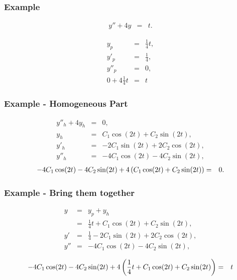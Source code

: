 \begin{frame}
  \frametitle{Example}

  \begin{eqnarray*}
    y'' + 4y & = & t.
  \end{eqnarray*}

  \begin{eqnarray*}
    y_p & = & \frac{1}{4} t, \\
    y'_p & = & \frac{1}{4}, \\
    y''_p & = & 0, \\
    0 + 4\frac{1}{4} t & = & t
  \end{eqnarray*}
\end{frame}

\begin{frame}
  \frametitle{Example - Homogeneous Part}

  \begin{eqnarray*}
    y''_h + 4y_h & = & 0, \\
    y_h & = & C_1 \cos(2t) + C_2 \sin(2t), \\
    y'_h & = & -2 C_1 \sin(2t) + 2 C_2 \cos(2t), \\
    y''_h & = & -4 C_1 \cos(2t) - 4 C_2 \sin(2t), 
  \end{eqnarray*}
  \begin{eqnarray*}
    -4 C_1 \cos(2t) - 4 C_2 \sin(2t) + 4\left( C_1 \cos(2t) + C_2 \sin(2t) \right) & = & 0.
  \end{eqnarray*}

\end{frame}


\begin{frame}
  \frametitle{Example - Bring them together}

  \begin{eqnarray*}
    y & = & y_p + y_h \\
    & = & \frac{1}{4} t + C_1 \cos(2t) + C_2 \sin(2t), \\
    y' & = & \frac{1}{4}  - 2 C_1 \sin(2t) + 2 C_2 \cos(2t), \\
    y'' & = & - 4 C_1 \cos(2t) - 4 C_2 \sin(2t),
  \end{eqnarray*}

  \begin{eqnarray*}
    - 4 C_1 \cos(2t) - 4 C_2 \sin(2t) + 4 \left( \frac{1}{4} t + C_1 \cos(2t) + C_2 \sin(2t) \right) & = & t
  \end{eqnarray*}

\end{frame}


